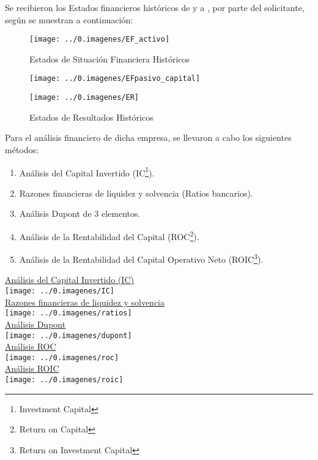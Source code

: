 Se recibieron los Estados financieros hist\'oricos de \EFde{} y a \EFhasta, por parte del  solicitante, seg\'un se muestran a continuaci\'on:

\begin{figure}[H]
\centering
\caption{Estados de Situaci\'on Financiera Hist\'oricos \EFdeHasta \label{fig:ESF}}
\texttt{[image: ../0.imagenes/EF\_activo]}\\[5pt]

\end{figure}
\begin{figure}[H]
\centering
\texttt{[image: ../0.imagenes/EFpasivo\_capital]}\\

\end{figure}

\begin{figure}[H]
\centering
\caption{Estados de Resultados Hist\'oricos \EFdeHasta \label{fig:ESF}}
\texttt{[image: ../0.imagenes/ER]}\\
\end{figure}


Para el an\'alisis financiero de dicha empresa, se llevaron a cabo los siguientes m\'etodos:
\begin{enumerate}
\item An\'alisis del Capital Invertido (IC\footnote{Investment Capital}).
\item Razones financieras de liquidez y solvencia (Ratios bancarios).
\item An\'alisis Dupont de 3 elementos.
\item An\'alisis de la Rentabilidad del Capital (ROC\footnote{Return on Capital}).
\item An\'alisis de la Rentabilidad del Capital Operativo Neto (ROIC\footnote{Return on Investment Capital}).
\end{enumerate}

\begin{center}
\underline{An\'alisis del Capital Invertido (IC)}\\[10pt]
\texttt{[image: ../0.imagenes/IC]}\\[10pt]

\underline{Razones financieras de liquidez y solvencia}\\[10pt]
\texttt{[image: ../0.imagenes/ratios]}\\[10pt]

\underline{An\'alisis Dupont}\\[10pt]
\texttt{[image: ../0.imagenes/dupont]}\\[10pt]
\newpage
\underline{An\'alisis ROC}\\[10pt]
\texttt{[image: ../0.imagenes/roc]}\\[10pt]



\underline{An\'alisis ROIC}\\[10pt]
\texttt{[image: ../0.imagenes/roic]}\\[10pt]
\end{center}